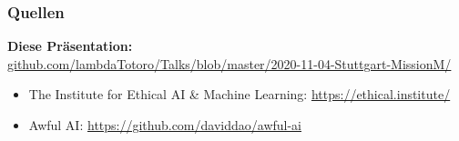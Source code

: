 \documentclass[aspectratio=169,xcolor=dvipsnames]{beamer}
\begin{document}
\begin{frame}
\frametitle{Quellen}
\small
\begin{center}
\textbf{Diese Präsentation:}\\
\url{github.com/lambdaTotoro/Talks/blob/master/2020-11-04-Stuttgart-MissionM/}
\end{center}
\bigskip

\begin{itemize}
\item The Institute for Ethical AI \& Machine Learning: \url{https://ethical.institute/}
\item Awful AI: \url{https://github.com/daviddao/awful-ai}
\end{itemize}
\end{frame}
\end{document}
